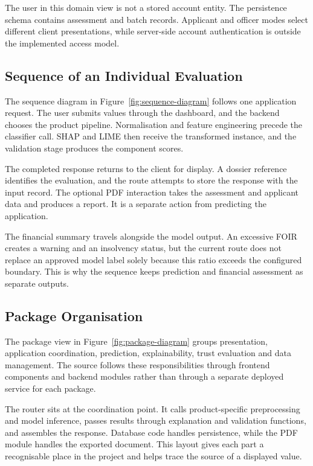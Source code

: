 The user in this domain view is not a stored account entity. The persistence schema contains assessment and batch records. Applicant and officer modes select different client presentations, while server-side account authentication is outside the implemented access model.

\subsection{Sequence of an Individual Evaluation}
The sequence diagram in Figure~\ref{fig:sequence-diagram} follows one application request. The user submits values through the dashboard, and the backend chooses the product pipeline. Normalisation and feature engineering precede the classifier call. SHAP and LIME then receive the transformed instance, and the validation stage produces the component scores.

The completed response returns to the client for display. A dossier reference identifies the evaluation, and the route attempts to store the response with the input record. The optional PDF interaction takes the assessment and applicant data and produces a report. It is a separate action from predicting the application.

The financial summary travels alongside the model output. An excessive FOIR creates a warning and an insolvency status, but the current route does not replace an approved model label solely because this ratio exceeds the configured boundary. This is why the sequence keeps prediction and financial assessment as separate outputs.


\subsection{Package Organisation}
The package view in Figure~\ref{fig:package-diagram} groups presentation, application coordination, prediction, explainability, trust evaluation and data management. The source follows these responsibilities through frontend components and backend modules rather than through a separate deployed service for each package.

The router sits at the coordination point. It calls product-specific preprocessing and model inference, passes results through explanation and validation functions, and assembles the response. Database code handles persistence, while the PDF module handles the exported document. This layout gives each part a recognisable place in the project and helps trace the source of a displayed value.

